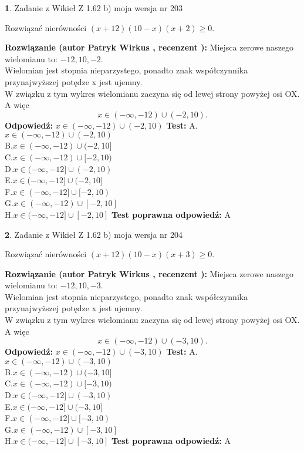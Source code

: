 \documentclass[12pt, a4paper]{article}
\theoremstyle{definition} %
\newtheorem{zad}{}
\newcommand{\zadStart}[1]{\begin{zad}#1\newline}
\newcommand{\zadStop}{\end{zad}}
\newcommand{\rozwStart}[2]{\noindent \textbf{Rozwiązanie (autor #1 , recenzent #2): }\newline}
\newcommand{\rozwStop}{\newline}
\newcommand{\odpStart}{\noindent \textbf{Odpowiedź:}\newline}
\newcommand{\odpStop}{\newline}
\newcommand{\testStart}{\noindent \textbf{Test:}\newline}
\newcommand{\testStop}{\newline}
\newcommand{\kluczStart}{\noindent \textbf{Test poprawna odpowiedź:}\newline}
\newcommand{\kluczStop}{\newline}
\begin{document}
\zadStart{Zadanie z Wikieł Z 1.62 b) moja wersja nr 203}

Rozwiązać nierówności $(x+12)(10-x)(x+2)\ge0$.
\zadStop
\rozwStart{Patryk Wirkus}{}
Miejsca zerowe naszego wielomianu to: $-12, 10, -2$.\\
Wielomian jest stopnia nieparzystego, ponadto znak współczynnika przy\linebreak najwyższej potędze x jest ujemny.\\ W związku z tym wykres wielomianu zaczyna się od lewej strony powyżej osi OX. A więc $$x \in (-\infty,-12) \cup (-2,10).$$
\rozwStop
\odpStart
$x \in (-\infty,-12) \cup (-2,10)$
\odpStop
\testStart
A.$x \in (-\infty,-12) \cup (-2,10)$\\
B.$x \in (-\infty,-12) \cup (-2,10]$\\
C.$x \in (-\infty,-12) \cup [-2,10)$\\
D.$x \in (-\infty,-12] \cup (-2,10)$\\
E.$x \in (-\infty,-12] \cup (-2,10]$\\
F.$x \in (-\infty,-12] \cup [-2,10)$\\
G.$x \in (-\infty,-12) \cup [-2,10]$\\
H.$x \in (-\infty,-12] \cup [-2,10]$
\testStop
\kluczStart
A
\kluczStop



\zadStart{Zadanie z Wikieł Z 1.62 b) moja wersja nr 204}

Rozwiązać nierówności $(x+12)(10-x)(x+3)\ge0$.
\zadStop
\rozwStart{Patryk Wirkus}{}
Miejsca zerowe naszego wielomianu to: $-12, 10, -3$.\\
Wielomian jest stopnia nieparzystego, ponadto znak współczynnika przy\linebreak najwyższej potędze x jest ujemny.\\ W związku z tym wykres wielomianu zaczyna się od lewej strony powyżej osi OX. A więc $$x \in (-\infty,-12) \cup (-3,10).$$
\rozwStop
\odpStart
$x \in (-\infty,-12) \cup (-3,10)$
\odpStop
\testStart
A.$x \in (-\infty,-12) \cup (-3,10)$\\
B.$x \in (-\infty,-12) \cup (-3,10]$\\
C.$x \in (-\infty,-12) \cup [-3,10)$\\
D.$x \in (-\infty,-12] \cup (-3,10)$\\
E.$x \in (-\infty,-12] \cup (-3,10]$\\
F.$x \in (-\infty,-12] \cup [-3,10)$\\
G.$x \in (-\infty,-12) \cup [-3,10]$\\
H.$x \in (-\infty,-12] \cup [-3,10]$
\testStop
\kluczStart
A
\kluczStop
\end{document}
